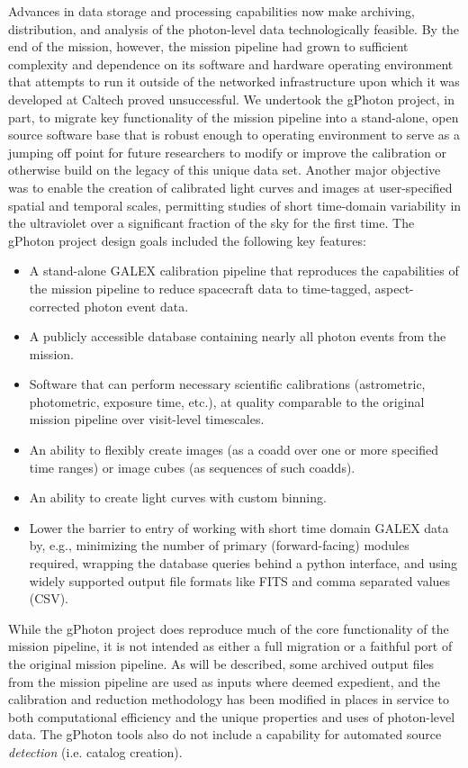 \documentclass[preprint]{aastex}
\begin{document}
Advances in data storage and processing capabilities now make archiving, distribution, and analysis of the photon-level data technologically feasible. By the end of the mission, however, the mission pipeline had grown to sufficient complexity and dependence on its software and hardware operating environment that attempts to run it outside of the networked infrastructure upon which it was developed at Caltech proved unsuccessful. We undertook the gPhoton project, in part, to migrate key functionality of the mission pipeline into a stand-alone, open source software base that is robust enough to operating environment to serve as a jumping off point for future researchers to modify or improve the calibration or otherwise build on the legacy of this unique data set. Another major objective was to enable the creation of calibrated light curves and images at user-specified spatial and temporal scales, permitting studies of short time-domain variability in the ultraviolet over a significant fraction of the sky for the first time. The gPhoton project design goals included the following key features:
\begin{itemize}
\item{A stand-alone GALEX calibration pipeline that reproduces the capabilities of the mission pipeline to reduce spacecraft data to time-tagged, aspect-corrected photon event data.}
\item{A publicly accessible database containing nearly all photon events from the mission.}
\item{Software that can perform necessary scientific calibrations (astrometric, photometric, exposure time, etc.), at quality comparable to the original mission pipeline over visit-level timescales.}
\item{An ability to flexibly create images (as a coadd over one or more specified time ranges) or image cubes (as sequences of such coadds).}
\item{An ability to create light curves with custom binning.}
\item{Lower the barrier to entry of working with short time domain GALEX data by, e.g., minimizing the number of primary (forward-facing) modules required, wrapping the database queries behind a python interface, and using widely supported output file formats like FITS and comma separated values (CSV).}
\end{itemize}

While the gPhoton project does reproduce much of the core functionality of the mission pipeline, it is not intended as either a full migration or a faithful port of the original mission pipeline. As will be described, some archived output files from the mission pipeline are used as inputs where deemed expedient, and the calibration and reduction methodology has been modified in places in service to both computational efficiency and the unique properties and uses of photon-level data. The gPhoton tools also do not include a capability for automated source \emph{detection} (i.e. catalog creation).
\end{document}
